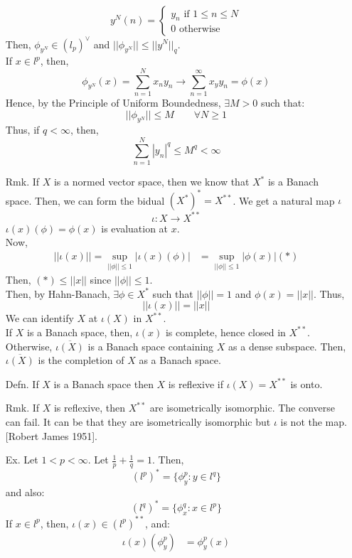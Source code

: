 \documentclass[12pt]{article}
\begin{document}
\begin{itemize}
    \[ y^N(n) = \begin{cases}
        y_n \text{ if } 1\leq n \leq N \\
        0 \text{ otherwise }
    \end{cases}\] 
    Then, $\phi_{y^N} \in (l_p)^\vee$ and $||\phi_{y^N}|| \leq ||y^N||_q$. \\
    If $x \in l^p$, then,
    \[\phi_{y^N}(x) = \sum_{n=1}^N x_ny_n \to \sum_{n=1}^\infty x_yy_n = \phi(x) \]
    Hence, by the Principle of Uniform Boundedness, $\exists M > 0$ such that:
    \[ ||\phi_{y^N}|| \leq M  \qquad \forall N \geq 1\]
    Thus, if $q < \infty$, then, 
    \[ \sum_{n=1}^N |y_n|^q \leq M^q < \infty \]
    \item[Rmk.] If $X$ is a normed vector space, then we know that $X^*$ is a Banach space. Then, we can form the bidual $(X^*)^* = X^{**}$. We get a natural map $\iota$
    \[ \iota: X \to X^{**}\]
    $\iota(x)(\phi) = \phi(x)$ is evaluation at $x$. \\
    Now, 
    \begin{align*}
        ||\iota(x)|| = \sup_{||\phi||\leq 1} | \iota(x)(\phi)|
        &= \sup_{||\phi||\leq 1} |\phi(x)|  (*)
    \end{align*}
    Then, $(*) \leq ||x||$ since $||\phi||\leq 1$. \\
    Then, by Hahn-Banach, $\exists \phi \in X^*$ such that $||\phi|| = 1$ and $\phi(x) = ||x||$. Thus, 
    \[||\iota(x)|| = ||x||\]
    We can identify $X$ at $\iota(X)$ in $X^{**}$. \\
    If $X$ is a Banach space, then, $\iota(x)$ is complete, hence closed in $X^{**}$. \\
    Otherwise, $\overline{\iota(X)}$ is a Banach space containing $X$ as a dense subspace. Then, $\overline{\iota(X)}$ is the completion of $X$ as a Banach space. 
    \item[Defn.] If $X$ is a Banach space then $X$ is reflexive if $\iota(X) = X^{**}$ is onto. 
    \item[Rmk.] If $X$ is reflexive, then $X^{**}$ are isometrically isomorphic. The converse can fail. It can be that they are isometrically isomorphic but $\iota$ is not the map. [Robert James 1951].
    \item[Ex.] Let $1 < p < \infty$. Let $\frac{1}{p} + \frac{1}{q} = 1$. Then,
    \[ (l^p)^{*} = \{\phi_y^p : y \in l^q\} \] 
    and also:
    \[ (l^q)^{*} = \{\phi_x^q : x \in l^p\} \]
    If $x \in l^p$, then, $\iota(x) \in (l^p)^{**}$, and:
    \begin{align*}
        \iota(x)(\phi_y^p) &= \phi_y^p(x) \\

\end{align*}
\end{itemize}
\end{document}

